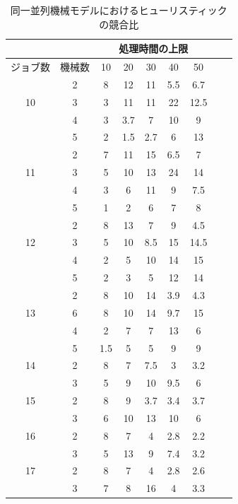 \documentclass[12pt]{optlab-bachelor}
\begin{document}
\begin{table}[htb]
  \begin{center}
    \begin{tabular}{|c|c|c|c|c|c|c|c|c|} \hline
      &  & \multicolumn{5}{c|}{処理時間の上限} \\ \hline
      ジョブ数 & 機械数& 10 & 20 & 30 & 40 & 50 \\ \hline \hline
      & 2 & 8 & 12 & 11 & 5.5 & 6.7   \\ \cline{2-7}
      10 & 3 & 3 & 11 & 11 & 22 & 12.5   \\ \cline{2-7}
      & 4 & 3 & 3.7 & 7 & 10 &  9  \\ \cline{2-7}
      & 5 & 2 & 1.5 & 2.7 & 6 & 13   \\ \hline \hline

      & 2 & 7 & 11 & 15 & 6.5 & 7   \\ \cline{2-7}
      11 & 3 & 5 & 10 & 13 & 24 & 14 \\ \cline{2-7}
      & 4 & 3 & 6 & 11 & 9 & 7.5   \\ \cline{2-7}
      & 5 & 1 & 2 & 6 & 7 & 8   \\ \hline \hline

      & 2 & 8 & 13 & 7 & 9 & 4.5   \\ \cline{2-7}
      12 & 3 & 5 & 10 & 8.5 & 15 & 14.5 \\ \cline{2-7}
      & 4 & 2 & 5 & 10 & 14 & 15   \\ \cline{2-7}
      & 5 & 2 & 3 & 5 & 12 & 14  \\ \hline \hline

      & 2 & 8 & 10 & 14 & 3.9 & 4.3 \\ \cline{2-7}
      13 & 6 & 8 & 10 & 14 & 9.7 & 15 \\ \cline{2-7}
      & 4 & 2 & 7 & 7 & 13 & 6 \\ \cline{2-7}
      & 5 & 1.5 & 5 & 5 & 9 & 9 \\ \hline \hline

      14 & 2 & 8 & 7 & 7.5 & 3 & 3.2 \\ \cline{2-7}
      & 3 & 5 & 9 & 10 & 9.5 & 6 \\ \hline \hline

      15 & 2 & 8 & 9 & 3.7 & 3.4 & 3.7 \\ \cline{2-7}
      & 3 & 6 & 10 & 13 & 10 & 6 \\ \hline \hline

      16 & 2 & 8 & 7 & 4 & 2.8 & 2.2 \\ \cline{2-7}
      & 3 & 5 & 13 & 9 & 7.4 & 3.2 \\ \hline \hline

      17 & 2 & 8 & 7 & 4 & 2.8 & 2.6 \\ \cline{2-7}
      & 3 & 7 & 8 & 16 & 4 & 3.3 \\ \hline \hline
    \end{tabular}
    \caption{同一並列機械モデルにおけるヒューリスティックの競合比}
    \label{A5}
  \end{center}
\end{table}
\end{document}
